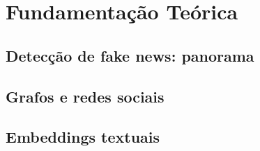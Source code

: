 
\chapter{Fundamenta\c{c}\~ao Te\'orica}
\label{cap:fundamentacao}

\section{Detec\c{c}\~ao de fake news: panorama}
\label{sec:panorama}

%
%

\section{Grafos e redes sociais}
\label{sec:grafos}

%
%

\section{Embeddings textuais}
\label{sec:embeddings}

%
%

